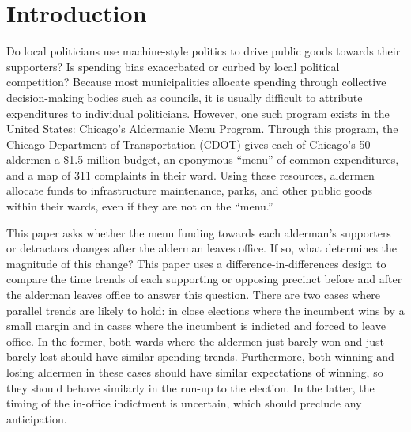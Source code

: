 \section{Introduction}\label{sec:Introduction}

Do local politicians use machine-style politics to drive public goods towards their supporters? Is spending bias exacerbated or curbed by local political competition?
Because most municipalities allocate spending through collective decision-making bodies such as councils, it is usually difficult to attribute expenditures to individual politicians.
However, one such program exists in the United States: Chicago's Aldermanic Menu Program.
Through this program, the Chicago Department of Transportation (CDOT) gives each of Chicago's 50 aldermen a \$1.5 million budget, an eponymous ``menu'' of common expenditures, and a map of 311 complaints in their ward.
Using these resources, aldermen allocate funds to infrastructure maintenance, parks, and other public goods within their wards, even if they are not on the ``menu.''

This paper asks whether the menu funding towards each alderman's supporters or detractors changes after the alderman leaves office.
If so, what determines the magnitude of this change? 
This paper uses a difference-in-differences design to compare the time trends of each supporting or opposing precinct before and after the alderman leaves office to answer this question.
There are two cases where parallel trends are likely to hold: in close elections where the incumbent wins by a small margin and in cases where the incumbent is indicted and forced to leave office.
In the former, both wards where the aldermen just barely won and just barely lost should have similar spending trends.
Furthermore, both winning and losing aldermen in these cases should have similar expectations of winning, so they should behave similarly in the run-up to the election.
In the latter, the timing of the in-office indictment is uncertain, which should preclude any anticipation.


